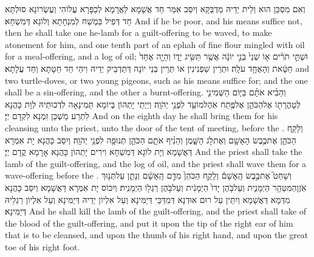 {וְאִם מִסְכֵּן הוּא וְלֵית יְדֵיהּ מַדְבְּקָא וְיִסַּב אִמַּר חַד אֲשָׁמָא לַאֲרָמָא לְכַפָּרָא עֲלוֹהִי וְעֶשְׂרוֹנָא סוּלְתָּא חַד דְּפִיל בִּמְשַׁח לְמִנְחָתָא וְלוֹגָא דְּמִשְׁחָא׃}
{And if he be poor, and his means suffice not, then he shall take one he-lamb for a guilt-offering to be waved, to make atonement for him, and one tenth part of an ephah of fine flour mingled with oil for a meal-offering, and a log of oil;}{}
{וּשְׁתֵּ֣י תֹרִ֗ים א֤וֹ שְׁנֵי֙ בְּנֵ֣י יוֹנָ֔ה אֲשֶׁ֥ר תַּשִּׂ֖יג יָד֑וֹ וְהָיָ֤ה אֶחָד֙ חַטָּ֔את וְהָאֶחָ֖ד עֹלָֽה׃}
{וּתְרֵין שַׁפְנִינִין אוֹ תְּרֵין בְּנֵי יוֹנָה דְּתַדְבֵּיק יְדֵיהּ וִיהֵי חַד חַטָּתָא וְחַד עֲלָתָא׃}
{and two turtle-doves, or two young pigeons, such as his means suffice for; and the one shall be a sin-offering, and the other a burnt-offering.}{}
{וְהֵבִ֨יא אֹתָ֜ם בַּיּ֧וֹם הַשְּׁמִינִ֛י לְטׇהֳרָת֖וֹ אֶל\maqqaf הַכֹּהֵ֑ן אֶל\maqqaf פֶּ֥תַח אֹֽהֶל\maqqaf מוֹעֵ֖ד לִפְנֵ֥י יְהֹוָֽה׃}
{וְיַיְתֵי יָתְהוֹן בְּיוֹמָא תְּמִינָאָה לִדְכוּתֵיהּ לְוָת כָּהֲנָא לִתְרַע מַשְׁכַּן זִמְנָא לִקְדָם יְיָ׃}
{And on the eighth day he shall bring them for his cleansing unto the priest, unto the door of the tent of meeting, before the \lord.}{}
{וְלָקַ֧ח הַכֹּהֵ֛ן אֶת\maqqaf כֶּ֥בֶשׂ הָאָשָׁ֖ם וְאֶת\maqqaf לֹ֣ג הַשָּׁ֑מֶן וְהֵנִ֨יף אֹתָ֧ם הַכֹּהֵ֛ן תְּנוּפָ֖ה לִפְנֵ֥י יְהֹוָֽה׃}
{וְיִסַּב כָּהֲנָא יָת אִמְּרָא דַּאֲשָׁמָא וְיָת לוֹגָא דְּמִשְׁחָא וִירִים יָתְהוֹן כָּהֲנָא אָרָמָא קֳדָם יְיָ׃}
{And the priest shall take the lamb of the guilt-offering, and the log of oil, and the priest shall wave them for a wave-offering before the \lord.}{}
{וְשָׁחַט֮ אֶת\maqqaf כֶּ֣בֶשׂ הָֽאָשָׁם֒ וְלָקַ֤ח הַכֹּהֵן֙ מִדַּ֣ם הָֽאָשָׁ֔ם וְנָתַ֛ן עַל\maqqaf תְּנ֥וּךְ אֹֽזֶן\maqqaf הַמִּטַּהֵ֖ר הַיְמָנִ֑ית וְעַל\maqqaf בֹּ֤הֶן יָדוֹ֙ הַיְמָנִ֔ית וְעַל\maqqaf בֹּ֥הֶן רַגְל֖וֹ הַיְמָנִֽית׃}
{וְיִכּוֹס יָת אִמְּרָא דַּאֲשָׁמָא וְיִסַּב כָּהֲנָא מִדְּמָא דַּאֲשָׁמָא וְיִתֵּין עַל רוּם אוּדְנָא דְּמִדַּכֵּי דְּיַמִּינָא וְעַל אִלְיוֹן יְדֵיהּ דְּיַמִּינָא וְעַל אִלְיוֹן רַגְלֵיהּ דְּיַמִּינָא׃}
{And he shall kill the lamb of the guilt-offering, and the priest shall take of the blood of the guilt-offering, and put it upon the tip of the right ear of him that is to be cleansed, and upon the thumb of his right hand, and upon the great toe of his right foot.}{}

